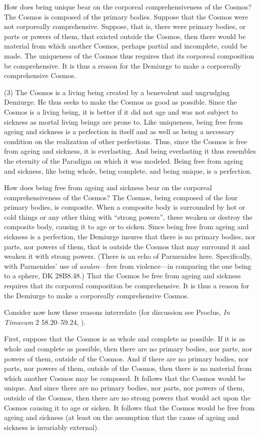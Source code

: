 How does being unique bear on the corporeal comprehensiveness of the Cosmos? The Cosmos is composed of the primary bodies. Suppose that the Cosmos were not corporeally comprehensive. Suppose, that is, there were primary bodies, or parts or powers of them, that existed outside the Cosmos, then there would be material from which another Cosmos, perhaps partial and incomplete, could be made. The uniqueness of the Cosmos thus requires that its corporeal composition be comprehensive.  It is thus a reason for the Demiurge to make a corporeally comprehensive Cosmos.

(3) The Cosmos is a living being created by a benevolent and ungrudging Demiurge. He thus seeks to make the Cosmos as good as possible. Since the Cosmos is a living being, it is better if it did not age and was not subject to sickness as mortal living beings are prone to. Like uniqueness, being free from ageing and sickness is a perfection in itself and as well as being a necessary condition on the realization of other perfections. Thus, since the Cosmos is free from ageing and sickness, it is everlasting. And being everlasting it thus resembles the eternity of the Paradigm on which it was modeled. Being free from ageing and sickness, like being whole, being complete, and being unique, is a perfection.

How does being free from ageing and sickness bear on the corporeal comprehensiveness of the Cosmos? The Cosmos, being composed of the four primary bodies, is composite. When a composite body is surrounded by hot or cold things or any other thing with ``strong powers'', these weaken or destroy the composite body, causing it to age or to sicken. Since being free from ageing and sickness is a perfection, the Demiurge insures that there is no primary bodies, nor parts, nor powers of them, that is outside the Cosmos that may surround it and weaken it with strong powers. (There is an echo of Parmenides here. Specifically, with Parmenides' use of \emph{asulon}---free from violence---in comparing the one being to a sphere, DK 28B8.48.) That the Cosmos be free from ageing and sickness requires that its corporeal composition be comprehensive.  It is thus a reason for the Demiurge to make a corporeally comprehensive Cosmos.

Consider now how these reasons interrelate (for discussion see Proclus, \emph{In Timaeum} 2 58.20--59.24, \citealt{Diehl:1903re}). 

First, suppose that the Cosmos is as whole and complete as possible. If it is as whole and complete as possible, then there are no primary bodies, nor parts, nor powers of them, outside of the Cosmos. And if there are no primary bodies, nor parts, nor powers of them, outside of the Cosmos, then there is no material from which another Cosmos may be composed. It follows that the Cosmos would be unique. And since there are no primary bodies, nor parts, nor powers of them, outside of the Cosmos, then there are no strong powers that would act upon the Cosmos causing it to age or sicken. It follows that the Cosmos would be free from ageing and sickness (at least on the assumption that the cause of ageing and sickness is invariably external).


